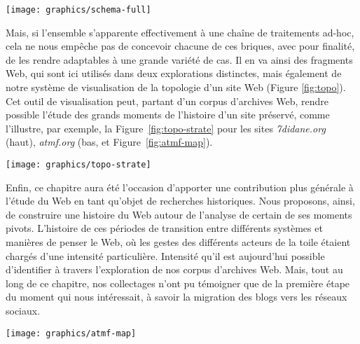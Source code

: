 \documentclass[symmetric,justified,marginals=raggedouter]{tufte-book}
\begin{document}
\begin{figure*}[hbtp]%
  \texttt{[image: graphics/schema-full]}
  \caption{Résumé des diverses opérations mises en place lors des explorations \protect\ref{sec:6_blogs} et \protect\ref{sec:6_printemps}, avec distinction entre approches automatiques et manuelles}
  \label{fig:schema-full}
\end{figure*}

Mais, si l'ensemble s'apparente effectivement à une chaîne de traitements ad-hoc, cela ne nous empêche pas de concevoir chacune de ces briques, avec pour finalité, de les rendre adaptables à une grande variété de cas. Il en va ainsi des fragments Web, qui sont ici utilisés dans deux explorations distinctes, mais également de notre système de visualisation de la topologie d'un site Web (Figure \ref{fig:topo}). Cet outil de visualisation peut, partant d'un corpus d'archives Web, rendre possible l'étude des grands moments de l'histoire d'un site préservé, comme l'illustre, par exemple, la Figure~\ref{fig:topo-strate} pour les sites \textit{7didane.org} (haut), \textit{atmf.org} (bas, et Figure~\ref{fig:atmf-map}).

\begin{figure*}%
  \texttt{[image: graphics/topo-strate]}
  \caption{vue de l'évolution de la structure des sites \textit{7didane.org} (haut), \textit{atmf.org} (bas)}
  \label{fig:topo-strate}
\end{figure*}

\noindent Enfin, ce chapitre aura été l'occasion d'apporter une contribution plus générale à l'étude du Web en tant qu'objet de recherches historiques. Nous proposons, ainsi, de construire une histoire du Web autour de l'analyse de certain de ses moments pivots. L'histoire de ces périodes de transition entre différents systèmes et manières de penser le Web, où les gestes des différents acteurs de la toile étaient chargés d'une intensité particulière. Intensité qu'il est aujourd'hui possible d'identifier à travers l'exploration de nos corpus d'archives Web. Mais, tout au long de ce chapitre, nos collectages n'ont pu témoigner que de la première étape du moment qui nous intéressait, à savoir la migration des blogs vers les réseaux sociaux.

\begin{marginfigure}%
  \texttt{[image: graphics/atmf-map]}
  \vspace*{0.2cm}  
  \caption{\textit{atmf.org} (rouge) dans l'e-Diaspora marocaine}
  \label{fig:atmf-map}
\end{marginfigure} 
\end{document}
